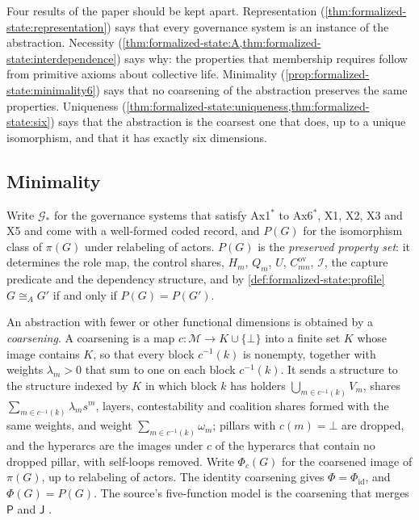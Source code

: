 \documentclass[11pt,letterpaper]{article}
\theoremstyle{definition}
\theoremstyle{remark}
\newcommand{\pP}{\mathsf{P}}
\newcommand{\pJ}{\mathsf{J}}
\newcommand{\Mset}{\mathcal{M}}
\newcommand{\Integ}{\mathcal{I}}
\newcommand{\ov}{\mathrm{ov}}
\begin{document}
Four results of the paper should be kept apart. Representation (\cref{thm:formalized-state:representation}) says that every governance system is an instance of the abstraction. Necessity (\cref{thm:formalized-state:A,thm:formalized-state:interdependence}) says why: the properties that membership requires follow from primitive axioms about collective life. Minimality (\cref{prop:formalized-state:minimality6}) says that no coarsening of the abstraction preserves the same properties. Uniqueness (\cref{thm:formalized-state:uniqueness,thm:formalized-state:six}) says that the abstraction is the coarsest one that does, up to a unique isomorphism, and that it has exactly six dimensions.

\subsection{Minimality}

Write $\mathcal{G}_*$ for the governance systems that satisfy Ax1$^{*}$ to Ax6$^{*}$, X1, X2, X3 and X5 and come with a well-formed coded record, and $P(G)$ for the isomorphism class of $\pi(G)$ under relabeling of actors. $P(G)$ is the \emph{preserved property set}: it determines the role map, the control shares, $H_m$, $Q_m$, $U$, $C^{\ov}_{mn}$, $\Integ$, the capture predicate and the dependency structure, and by \cref{def:formalized-state:profile} $G\cong_AG'$ if and only if $P(G)=P(G')$.

An abstraction with fewer or other functional dimensions is obtained by a \emph{coarsening}. A coarsening is a map $c:\Mset\to K\cup\{\bot\}$ into a finite set $K$ whose image contains $K$, so that every block $c^{-1}(k)$ is nonempty, together with weights $\lambda_m>0$ that sum to one on each block $c^{-1}(k)$. It sends a structure to the structure indexed by $K$ in which block $k$ has holders $\bigcup_{m\in c^{-1}(k)}V_m$, shares $\sum_{m\in c^{-1}(k)}\lambda_ms^m$, layers, contestability and coalition shares formed with the same weights, and weight $\sum_{m\in c^{-1}(k)}\omega_m$; pillars with $c(m)=\bot$ are dropped, and the hyperarcs are the images under $c$ of the hyperarcs that contain no dropped pillar, with self-loops removed. Write $\Phi_c(G)$ for the coarsened image of $\pi(G)$, up to relabeling of actors. The identity coarsening gives $\Phi=\Phi_{\mathrm{id}}$, and $\Phi(G)=P(G)$. The source's five-function model is the coarsening that merges $\pP$ and $\pJ$ \citep{largo2026hbs}.
\end{document}
